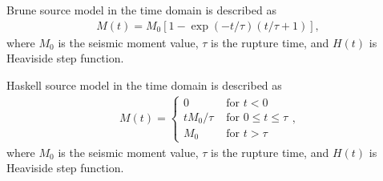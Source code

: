 \documentclass[letterpaper,10pt,english]{sphinxmanual}
\begin{document}
\begin{fulllineitems}
\label{\detokenize{api_lib:source_models.BaseSourceModel}}
\pysigstartsignatures
{}
\pysigstopsignatures
\end{fulllineitems}


\begin{fulllineitems}
\label{\detokenize{api_lib:source_models.BruneSourceModel}}
\pysigstartsignatures
{}
\pysigstopsignatures
\sphinxAtStartPar
Brune source model in the time domain is described as
\begin{equation*}
\begin{split}M\left( t \right) = M_0\left[ 1 - \exp\left( -t/ \tau \right)\left( t/ \tau +1 \right) \right],\end{split}
\end{equation*}
\sphinxAtStartPar
where \(M_0\) is the seismic moment value, \(\tau\) is the rupture time,
and \(H(t)\) is Heaviside step function.

\end{fulllineitems}


\begin{fulllineitems}
\label{\detokenize{api_lib:source_models.HaskellSourceModel}}
\pysigstartsignatures
{}
\pysigstopsignatures
\sphinxAtStartPar
Haskell source model in the time domain is described as
\begin{equation*}
\begin{split}M\left( t \right)= \begin{cases}
0 & \text{ for } t < 0 \\
tM_0/\tau & \text{ for } 0 \leqslant  t \leqslant \tau \\
M_0 & \text{ for } t > \tau
\end{cases},\end{split}
\end{equation*}
\sphinxAtStartPar
where \(M_0\) is the seismic moment value, \(\tau\) is the rupture time,
and \(H(t)\) is Heaviside step function.

\end{fulllineitems}
\end{document}
